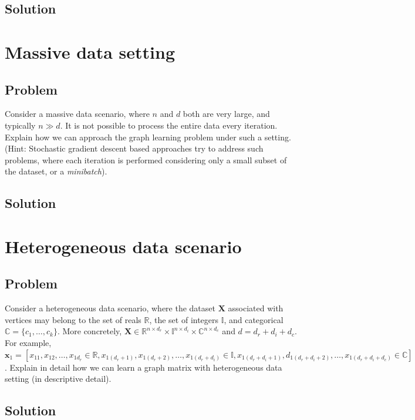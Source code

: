 \documentclass[a4paper]{article}
\newcommand{\mf}{\mathbf}
\newcommand{\mb}{\mathbb}
\newcommand{\R}{\mathbb{R}}
\begin{document}
\subsection{Solution}

\section{Massive data setting}

\subsection{Problem}

Consider a massive data scenario, where $n$ and $d$ both are very large, and typically $n \gg d$. It is not possible to process the entire data every iteration. Explain how we can approach
the graph learning problem under such a setting. (Hint: Stochastic gradient descent based approaches try to address such problems, where each iteration is performed considering only a small
subset of the dataset, or a \emph{minibatch}).

\subsection{Solution}


\section{Heterogeneous data scenario}

\subsection{Problem}

Consider a heterogeneous data scenario, where the dataset $\mf{X}$ associated with vertices may belong to the set of reals $\R$, the set of integers $\mb{I}$, and categorical $\mb{C} = \{c_1,
\ldots, c_k\}$. More concretely, $\mf{X} \in \R^{n \times d_r} \times \mb{I}^{n \times d_i} \times \mb{C}^{n \times d_c}$ and $d = d_r + d_i + d_c$. For example, $\mf{x}_1 = [x_{11}, x_{12},
\ldots, x_{1d_r} \in \R, x_{1(d_r + 1)}, x_{1(d_r + 2)}, \ldots, x_{1(d_r + d_i)} \in \mb{I}, x_{1(d_r + d_i + 1)}, d_{1(d_r + d_i + 2)}, \ldots, x_{1(d_r + d_i + d_c)} \in \mb{C}]$. Explain in
detail how we can learn a graph matrix with heterogeneous data setting (in descriptive detail).

\subsection{Solution}
\end{document}
